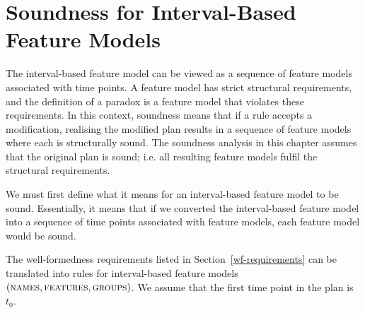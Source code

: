 \section{Soundness for Interval-Based Feature \break Models}
\label{sec:soundness-for-interval-based-feature-models}
The interval-based feature model can be viewed as a sequence of feature models associated with time points. A feature model has strict structural requirements, and the definition of a paradox is a feature model that violates these requirements. In this context, soundness means that if a rule accepts a modification, realising the modified plan results in a sequence of feature models where each is structurally sound. The soundness analysis in this chapter assumes that the original plan is sound; i.e. all resulting feature models fulfil the structural requirements. 

We must first define what it means for an interval-based feature model to be sound. Essentially, it means that if we converted the interval-based feature model into a sequence of time points associated with feature models, each feature model would be sound.


The well-formedness requirements listed in Section~\vref{wf-requirements} can be translated into rules for interval-based feature models $(\textsc{names},\allowbreak \textsc{features}, \allowbreak \textsc{groups}{})$. We assume that the first time point in the plan is $t_0$.

